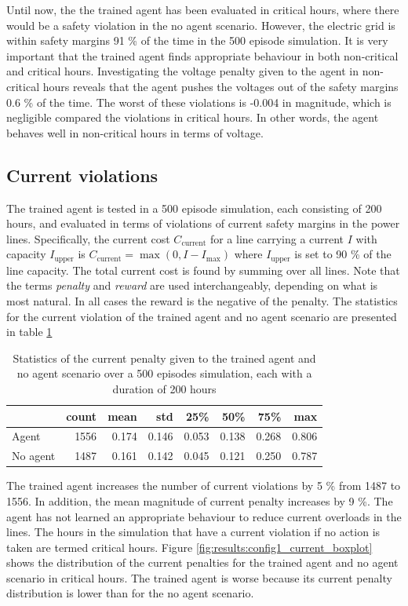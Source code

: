 \documentclass[class=book, crop=false, 11pt]{standalone}
\begin{document}
Until now, the the trained agent has been evaluated in critical hours, where there would be a safety violation in the no agent scenario. However, the electric grid is within safety margins 91 \% of the time in the 500 episode simulation. It is very important that the trained agent finds appropriate behaviour in both non-critical and critical hours. Investigating the voltage penalty given to the agent in non-critical hours reveals that the agent pushes the voltages out of the safety margins 0.6 \% of the time. The worst of these violations is -0.004 in magnitude, which is negligible  compared the violations in critical hours. In other words, the agent behaves well in non-critical hours in terms of voltage. 


\subsection{Current violations}\label{section:config1:current_violations}
The trained agent is tested in a 500 episode simulation, each consisting of 200 hours, and evaluated in terms of violations of current safety margins in the power lines. Specifically, the current cost $C_{\textrm{current}}$ for a line carrying a current $I$ with capacity $I_{\textrm{upper}}$ is $C_{\textrm{current}} = \max(0,I - I_{\textrm{max}})$ where $I_{\textrm{upper}}$ is set to 90 \% of the line capacity. The total current cost is found by summing over all lines. Note that the terms \textit{penalty} and \textit{reward} are used interchangeably, depending on what is most natural. In all cases the reward is the negative of the penalty. The statistics for the current violation of the trained agent and no agent scenario are presented in table \ref{table:results:configuration1_reward_500_episodes_current}

\begin{table}[h]
\center
\caption{Statistics of the current penalty given to the trained agent and no agent scenario over a 500 episodes simulation, each with a duration of 200 hours}
\begin{tabular}{l|rrrrrrr}
         & count    & mean  & std   & 25\%  & 50\%  & 75\%  & max   \\
\hline
Agent    & 1556 & 0.174 & 0.146 & 0.053 & 0.138 & 0.268 & 0.806 \\
No agent & 1487 & 0.161 & 0.142 & 0.045 & 0.121 & 0.250 & 0.787 \\
\hline
\end{tabular}
\label{table:results:configuration1_reward_500_episodes_current}
\end{table}
The trained agent increases the number of current violations by 5 \% from 1487 to 1556. In addition, the mean magnitude of current penalty increases by 9 \%. The agent has not learned an appropriate behaviour to reduce current overloads in the lines. The hours in the simulation that have a current violation if no action is taken are termed critical hours. Figure \ref{fig:results:config1_current_boxplot} shows the distribution of the current penalties for the trained agent and no agent scenario in critical hours. The trained agent is worse because its current penalty distribution is lower than for the no agent scenario.
\end{document}
